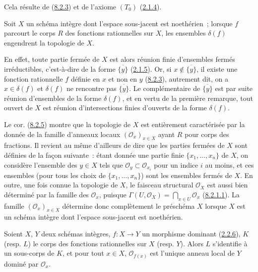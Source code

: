 Cela résulte de (\hyperref[I.8.2.3-fr]{8.2.3}) et de l'axiome
$(T_0)$ (\hyperref[I.2.1.4-fr]{2.1.4}).

\begin{corollary}[8.2.5]
\label{I.8.2.5-fr}
Soit $X$ un schéma intègre dont l'espace sous-jacent est noethérien~;
lorsque $f$ parcourt le corps $R$ des fonctions rationnelles sur $X$, les
ensembles $\delta(f)$ engendrent la topologie de $X$.
\end{corollary}

En effet, toute partie fermée de $X$ est alors réunion finie d'ensembles
fermés irréductibles, c'est-à-dire de la forme $\overline{\{y\}}$
(\hyperref[I.2.1.5-fr]{2.1.5}). Or, si
$x\notin\overline{\{y\}}$, il existe une fonction rationnelle $f$ définie en
$x$ et non en $y$ (\hyperref[I.8.2.3-fr]{8.2.3}), autrement dit, on a
$x\in\delta(f)$ et $\delta(f)$ ne rencontre pas $\overline{\{y\}}$. Le
complémentaire de $\overline{\{y\}}$ est par suite réunion d'ensembles de la
forme $\delta(f)$, et en vertu de la première remarque, tout ouvert de $X$ est
réunion d'intersections finies d'ouverts de la forme $\delta(f)$.

\begin{env}[8.2.6]
\label{I.8.2.6-fr}
Le cor. (\hyperref[I.8.2.5-fr]{8.2.5}) montre que la topologie de $X$ est
entièrement caractérisée par la donnée de la famille d'anneaux locaux
$(\mathscr{O}_x)_{x\in X}$ ayant $R$ pour corps des fractions. Il revient au
même d'ailleurs de dire que les parties fermées de $X$ sont définies de la
façon suivante~: étant donnée une partie finie
$\{x_1,\ldots,x_n\}$ de $X$, on considère l'ensemble des $y\in X$ tels que
$\mathscr{O}_y\subset\mathscr{O}_{x_i}$ pour un indice $i$ au moins, et ces
ensembles (pour tous les choix de $\{x_1,\ldots,x_n\}$) sont les ensembles
fermés de $X$. En outre, une fois connue la topologie de $X$, le faisceau
structural $\mathscr{O}_X$ est aussi bien déterminé par la famille des
$\mathscr{O}_x$, puisque
$\Gamma(U,\mathscr{O}_X)=\bigcap_{x\in U}\mathscr{O}_x$
(\hyperref[I.8.2.1.1-fr]{8.2.1.1}). La famille
$(\mathscr{O}_x)_{x\in X}$ détermine donc complètement le préschéma $X$
lorsque $X$ est un schéma intègre dont l'espace sous-jacent est noethérien.
\end{env}

\begin{proposition}[8.2.7]
\label{I.8.2.7-fr}
Soient $X$, $Y$ deux schémas intègres, $f:X\to Y$ un morphisme dominant
(\hyperref[I.2.2.6-fr]{2.2.6}), $K$ (resp. $L$) le corps des fonctions
rationnelles sur $X$ (resp. $Y$). Alors $L$ s'identifie à un sous-corps de
$K$, et pour tout $x\in X$, $\mathscr{O}_{f(x)}$ est l'unique anneau local de
$Y$ dominé par $\mathscr{O}_x$.
\end{proposition}

